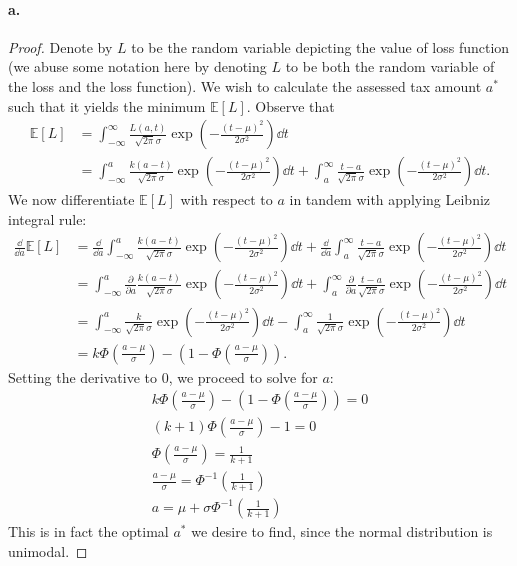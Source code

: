 \documentclass{exam}
\newcommand{\paren}[1]{\left(#1\right)}
\begin{document}
\paragraph{a.}
\begin{proof}
	
	Denote by $L$ to be the random variable depicting the value of loss function (we abuse some notation here by denoting $L$ to be both the random variable of the loss and the loss function). We wish to calculate the assessed tax amount $a^*$ such that it yields the minimum $\mathbb E[L]$. Observe that
	\begin{align*}
		\mathbb E[L] &= \int_{-\infty}^\infty \frac{L(a, t)}{\sqrt{2\pi}\sigma}\exp\paren{-\frac{(t - \mu)^2}{2\sigma^2}}\dd t \\
		&= \int_{-\infty}^a \frac{k(a - t)}{\sqrt{2\pi}\sigma}\exp\paren{-\frac{(t - \mu)^2}{2\sigma^2}} \dd t + \int_a^\infty \frac{t - a}{\sqrt{2\pi}\sigma}\exp\paren{-\frac{(t - \mu)^2}{2\sigma^2}}\dd t.
	\end{align*}
	We now differentiate $\mathbb E[L]$ with respect to $a$ in tandem with applying Leibniz integral rule:
	\begin{align}
		\frac{\dd}{\dd a} \mathbb E[L] &= \frac{\dd}{\dd a} \int_{-\infty}^a \frac{k(a - t)}{\sqrt{2\pi}\sigma} \exp\paren{-\frac{(t - \mu)^2}{2\sigma^2}}\dd t + \frac{\dd}{\dd a} \int_a^\infty \frac{t - a}{\sqrt{2\pi}\sigma} \exp\paren{-\frac{(t - \mu)^2}{2\sigma^2}}\dd t \\
		&= \int_{-\infty}^a \frac{\partial}{\partial a} \frac{k(a - t)}{\sqrt{2\pi}\sigma} \exp\paren{-\frac{(t - \mu)^2}{2\sigma^2}}\dd t + \int_a^{\infty} \frac{\partial}{\partial a} \frac{t - a}{\sqrt{2\pi}\sigma} \exp\paren{-\frac{(t - \mu)^2}{2\sigma^2}}\dd t \\
		&= \int_{-\infty}^a \frac{k}{\sqrt{2\pi}\sigma} \exp\paren{-\frac{(t - \mu)^2}{2\sigma^2}}\dd t - \int_a^{\infty} \frac1{\sqrt{2\pi}\sigma}\exp\paren{-\frac{(t - \mu)^2}{2\sigma^2}}\dd t \\
		&= k\Phi\paren{\frac{a - \mu}{\sigma}} - \paren{1 - \Phi\paren{\frac{a - \mu}{\sigma}}}.
	\end{align}
	Setting the derivative to $0$, we proceed to solve for $a$:
	\begin{gather*}
		k\Phi\paren{\frac{a - \mu}{\sigma}} - \paren{1 - \Phi\paren{\frac{a - \mu}{\sigma}}} = 0 \\
		(k + 1)\Phi\paren{\frac{a - \mu}{\sigma}} - 1 = 0 \\
		\Phi\paren{\frac{a - \mu}{\sigma}} = \frac{1}{k + 1} \\
		\frac{a - \mu}{\sigma} = \Phi^{-1}\paren{\frac1{k + 1}} \\
		a = \mu + \sigma\Phi^{-1}(\frac1{k + 1})
	\end{gather*}
	This is in fact the optimal $a^*$ we desire to find, since the normal distribution is unimodal.
\end{proof}
\end{document}
